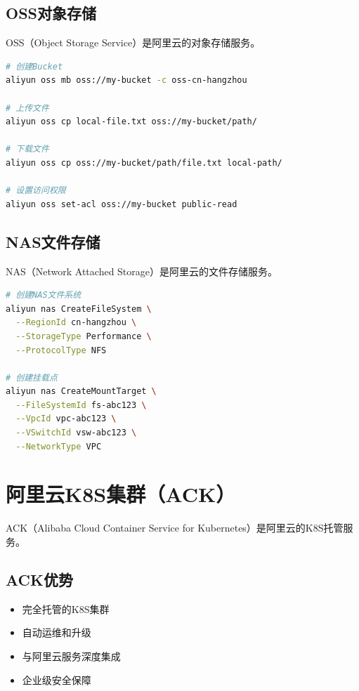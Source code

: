 \documentclass[12pt,UTF8]{ctexbook}
\begin{document}
\subsection{OSS对象存储}

OSS（Object Storage Service）是阿里云的对象存储服务。

\begin{lstlisting}[language=bash]
# 创建Bucket
aliyun oss mb oss://my-bucket -c oss-cn-hangzhou

# 上传文件
aliyun oss cp local-file.txt oss://my-bucket/path/

# 下载文件
aliyun oss cp oss://my-bucket/path/file.txt local-path/

# 设置访问权限
aliyun oss set-acl oss://my-bucket public-read
\end{lstlisting}

\subsection{NAS文件存储}

NAS（Network Attached Storage）是阿里云的文件存储服务。

\begin{lstlisting}[language=bash]
# 创建NAS文件系统
aliyun nas CreateFileSystem \
  --RegionId cn-hangzhou \
  --StorageType Performance \
  --ProtocolType NFS

# 创建挂载点
aliyun nas CreateMountTarget \
  --FileSystemId fs-abc123 \
  --VpcId vpc-abc123 \
  --VSwitchId vsw-abc123 \
  --NetworkType VPC
\end{lstlisting}

\section{阿里云K8S集群（ACK）}
\label{sec:aliyun-k8s}

ACK（Alibaba Cloud Container Service for Kubernetes）是阿里云的K8S托管服务。

\subsection{ACK优势}

\begin{itemize}
    \item 完全托管的K8S集群
    \item 自动运维和升级
    \item 与阿里云服务深度集成
    \item 企业级安全保障
\end{itemize}
\end{document}
